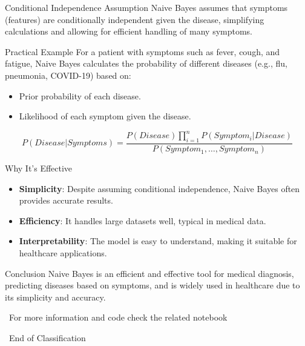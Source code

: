 \documentclass[serif, aspectratio=169]{beamer}
\begin{document}
\begin{frame}{Conditional Independence Assumption}
Naive Bayes assumes that symptoms (features) are conditionally independent given the disease, simplifying calculations and allowing for efficient handling of many symptoms.
\end{frame}

\begin{frame}{Practical Example}
For a patient with symptoms such as fever, cough, and fatigue, Naive Bayes calculates the probability of different diseases (e.g., flu, pneumonia, COVID-19) based on:
\begin{itemize}
    \item Prior probability of each disease.
    \item Likelihood of each symptom given the disease.
\end{itemize}

\[
P(Disease|Symptoms) = \frac{P(Disease) \prod_{i=1}^{n} P(Symptom_i|Disease)}{P(Symptom_1, \dots, Symptom_n)}
\]
\end{frame}

\begin{frame}{Why It’s Effective}
\begin{itemize}
    \item \textbf{Simplicity}: Despite assuming conditional independence, Naive Bayes often provides accurate results.
    \item \textbf{Efficiency}: It handles large datasets well, typical in medical data.
    \item \textbf{Interpretability}: The model is easy to understand, making it suitable for healthcare applications.
\end{itemize}
\end{frame}

\begin{frame}{Conclusion}
Naive Bayes is an efficient and effective tool for medical diagnosis, predicting diseases based on symptoms, and is widely used in healthcare due to its simplicity and accuracy.
\end{frame}


\begin{frame}
    \begin{center}
        {\Huge\ \color{red}For more information and code check the related notebook}
    \end{center}
\end{frame}


\begin{frame}
    \begin{center}
        {\Huge\ End of Classification}
    \end{center}
\end{frame}
\end{document}
